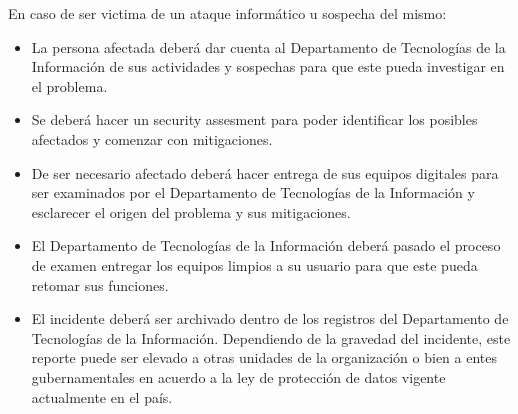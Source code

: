 En caso de ser victima de un ataque informático u sospecha del mismo:
\begin{itemize}
    \item La persona afectada deberá dar cuenta al Departamento de Tecnologías de la Información de sus actividades y sospechas para que este pueda investigar en el problema.
    \item Se deberá hacer un security assesment para poder identificar los posibles afectados y comenzar con mitigaciones.
    \item De ser necesario afectado deberá hacer entrega de sus equipos digitales para ser examinados por el Departamento de Tecnologías de la Información y esclarecer el origen del problema y sus mitigaciones.
    \item El Departamento de Tecnologías de la Información deberá pasado el proceso de examen entregar los equipos limpios a su usuario para que este pueda retomar sus funciones.
    \item El incidente deberá ser archivado dentro de los registros del Departamento de Tecnologías de la Información. Dependiendo de la gravedad del incidente, este reporte puede ser elevado a otras unidades de la organización o bien a entes gubernamentales en acuerdo a la ley de protección de datos vigente actualmente en el país.
\end{itemize}